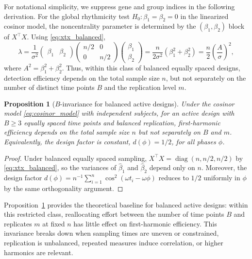 \documentclass{article}
\newtheorem{proposition}{Proposition}[section]
\begin{document}
For notational simplicity, we suppress gene and group indices in the following
derivation. For the global rhythmicity test
$H_0:\beta_1=\beta_2=0$ in the linearized cosinor model, the noncentrality
parameter is determined by the $(\beta_1,\beta_2)$ block of $X^\top X$. Using
\eqref{eq:xtx_balanced},
\begin{equation}
\lambda
=
\frac{1}{\sigma^2}
\begin{pmatrix}\beta_1 & \beta_2\end{pmatrix}
\begin{pmatrix} n/2 & 0 \\ 0 & n/2 \end{pmatrix}
\begin{pmatrix}\beta_1 \\ \beta_2\end{pmatrix}
=
\frac{n}{2\sigma^2}(\beta_1^2+\beta_2^2)
=
\frac{n}{2}\left(\frac{A}{\sigma}\right)^2,
\label{eq:ncp_active}
\end{equation}
where $A^2=\beta_1^2+\beta_2^2$. Thus, within this class of balanced equally
spaced designs, detection efficiency depends on the total sample size $n$, but
not separately on the number of distinct time points $B$ and the replication
level $m$.

\begin{proposition}[$B$-invariance for balanced active designs]
\label{prop:b_invariance}
Under the cosinor model \eqref{eq:cosinor_model} with independent subjects, for
an active design with $B\geq 3$ equally spaced time points and balanced
replication, first-harmonic efficiency depends on the total sample size $n$ but
not separately on $B$ and $m$. Equivalently, the design factor is constant,
$d(\phi)=1/2$, for all phases $\phi$.
\end{proposition}

\begin{proof}
Under balanced equally spaced sampling,
$X^\top X=\operatorname{diag}(n,n/2,n/2)$ by
\eqref{eq:xtx_balanced}, so the variances of $\hat\beta_1$ and $\hat\beta_2$
depend only on $n$. Moreover, the design factor
$d(\phi)=n^{-1}\sum_{i=1}^n \cos^2(\omega t_i-\omega\phi)$ reduces to $1/2$
uniformly in $\phi$ by the same orthogonality argument.
\end{proof}

Proposition~\ref{prop:b_invariance} provides the theoretical baseline for
balanced active designs: within this restricted class, reallocating effort
between the number of time points $B$ and replicates $m$ at fixed $n$ has
little effect on first-harmonic efficiency. This invariance breaks down when
sampling times are uneven or constrained, replication is unbalanced, repeated
measures induce correlation, or higher harmonics are relevant.
\end{document}
